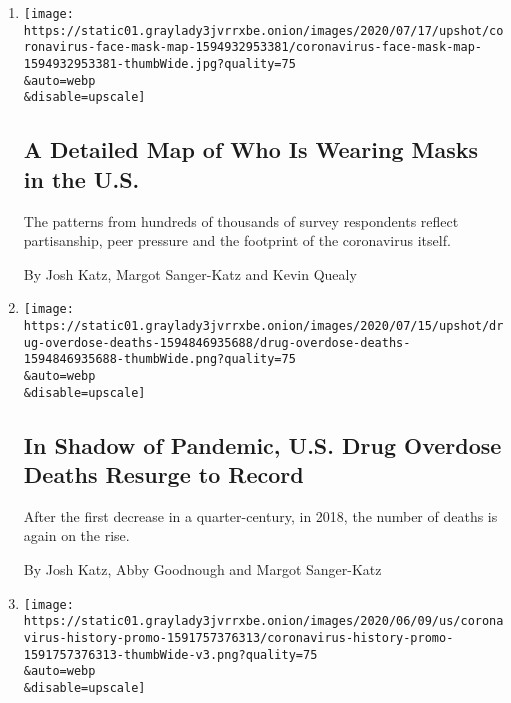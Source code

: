 \begin{enumerate}
\def\labelenumi{\arabic{enumi}.}
\item
  \href{/interactive/2020/07/17/upshot/coronavirus-face-mask-map.html}{}

  \texttt{[image: https://static01.graylady3jvrrxbe.onion/images/2020/07/17/upshot/coronavirus-face-mask-map-1594932953381/coronavirus-face-mask-map-1594932953381-thumbWide.jpg?quality=75\\\&auto=webp\\\&disable=upscale]}

  \hypertarget{a-detailed-map-of-who-is-wearing-masks-in-the-us}{%
  \subsection{A Detailed Map of Who Is Wearing Masks in the
  U.S.}\label{a-detailed-map-of-who-is-wearing-masks-in-the-us}}

  The patterns from hundreds of thousands of survey respondents reflect
  partisanship, peer pressure and the footprint of the coronavirus
  itself.

  By Josh Katz, Margot Sanger-Katz and Kevin Quealy
\item
  \href{/interactive/2020/07/15/upshot/drug-overdose-deaths.html}{}

  \texttt{[image: https://static01.graylady3jvrrxbe.onion/images/2020/07/15/upshot/drug-overdose-deaths-1594846935688/drug-overdose-deaths-1594846935688-thumbWide.png?quality=75\\\&auto=webp\\\&disable=upscale]}

  \hypertarget{in-shadow-of-pandemic-us-drug-overdose-deaths-resurge-to-record}{%
  \subsection{In Shadow of Pandemic, U.S. Drug Overdose Deaths Resurge
  to
  Record}\label{in-shadow-of-pandemic-us-drug-overdose-deaths-resurge-to-record}}

  After the first decrease in a quarter-century, in 2018, the number of
  deaths is again on the rise.

  By Josh Katz, Abby Goodnough and Margot Sanger-Katz
\item
  \href{/interactive/2020/06/10/world/coronavirus-history.html}{}

  \texttt{[image: https://static01.graylady3jvrrxbe.onion/images/2020/06/09/us/coronavirus-history-promo-1591757376313/coronavirus-history-promo-1591757376313-thumbWide-v3.png?quality=75\\\&auto=webp\\\&disable=upscale]}

  \hypertarget{how-the-coronavirus-compares-with-100-years-of-deadly-events}{%
}
\end{enumerate}
